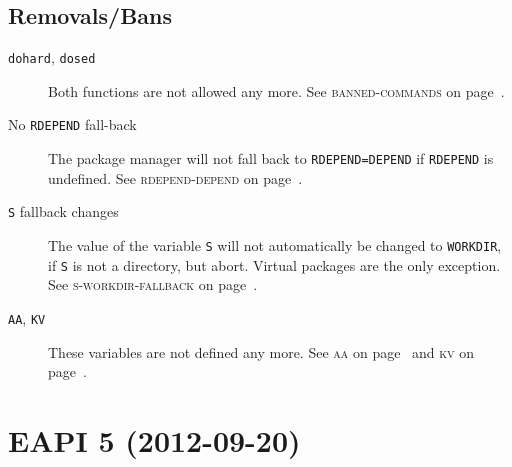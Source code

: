 \documentclass[a4paper]{leaflet}
\newcommand{\code}[1]{\texttt{#1}}
\newcommand{\featureref}[1]{\textsc{#1} on page~\pageref{feat:#1}}
\begin{document}
\subsection{Removals/Bans}
\label{sec:cs:eapi4-removalsbans}
\begin{description}
    \item[\code{dohard}, \code{dosed}] Both functions are not allowed
    any more.  See \featureref{banned-commands}.
    \item[No \code{RDEPEND} fall-back] The package manager will not
    fall back to \code{RDEPEND=DEPEND} if \code{RDEPEND} is undefined.
    See \featureref{rdepend-depend}.
    \item[\code{S} fallback changes] The value of the variable
    \code{S} will not automatically be changed to \code{WORKDIR}, if
    \code{S} is not a directory, but abort.  Virtual packages are the
    only exception.  See \featureref{s-workdir-fallback}.
    \item[\code{AA}, \code{KV}] These variables are not defined
    any more.  See \featureref{aa} and \featureref{kv}.
\end{description}

\section{EAPI 5 (2012-09-20)}
\label{sec:cs:eapi5}
\end{document}
